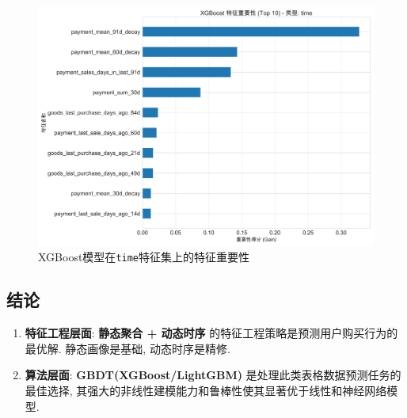 \documentclass[11pt, a4paper]{article}
\begin{document}
\begin{figure}[H]
    \centering
    \includegraphics[width=\textwidth]{../analysis/xgb_time_feature_importance.png}
    \caption{XGBoost模型在\texttt{time}特征集上的特征重要性}
    \label{fig:xgb_time}
\end{figure}


\subsection{结论}
\begin{enumerate}
    \item \textbf{特征工程层面}: \textbf{静态聚合 + 动态时序} 的特征工程策略是预测用户购买行为的最优解. 静态画像是基础, 动态时序是精修.
    \item \textbf{算法层面}: \textbf{GBDT(XGBoost/LightGBM)} 是处理此类表格数据预测任务的最佳选择, 其强大的非线性建模能力和鲁棒性使其显著优于线性和神经网络模型.
\end{enumerate}
\end{document}
